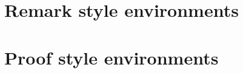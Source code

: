 \documentclass{article}
\begin{document}
\begin{exercise*}\leavevmode
\begin{verbatim*}
\begin{exercise*}
\end{exercise*}
\end{verbatim*}
\end{exercise*}

\section{Remark style environments}

\begin{example}\leavevmode
\begin{verbatim*}
\begin{example}
\end{example}
\end{verbatim*}
\end{example}

\begin{example*}\leavevmode
\begin{verbatim*}
\begin{example*}
\end{example*}
\end{verbatim*}
\end{example*}

\begin{remark}\leavevmode
\begin{verbatim*}
\begin{remark}
\end{remark}
\end{verbatim*}
\end{remark}

\begin{remark*}\leavevmode
\begin{verbatim*}
\begin{remark*}
\end{remark*}
\end{verbatim*}
\end{remark*}

\section{Proof style environments}

\begin{solution}\leavevmode
\begin{verbatim*}
\begin{solution}
\end{solution}
\end{verbatim*}
\end{solution}

\begin{solution}[1]\leavevmode
\begin{verbatim*}
\begin{solution}[1]
\end{solution}
\end{verbatim*}
\end{solution}
\end{document}

